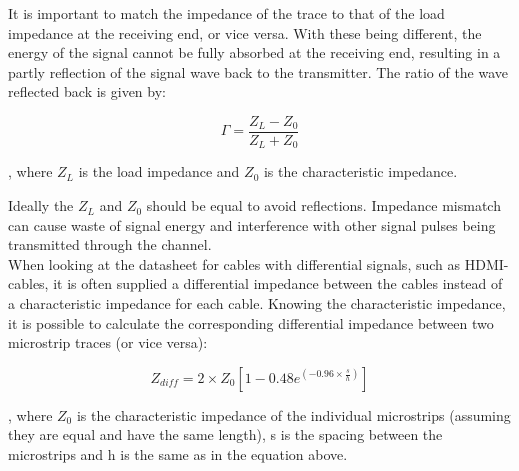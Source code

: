 \documentclass[main.tex]{subfiles}
\begin{document}
It is important to match the impedance of the trace to that of the load impedance at the receiving end, or vice versa. With these being different, the energy of the signal cannot be fully absorbed at the receiving end, resulting in a partly reflection of the signal wave back to the transmitter. The ratio of the wave reflected back is given by:

\begin{equation}
\Gamma = \frac{Z_L - Z_0}{Z_L + Z_0}	
\end{equation}

, where $Z_L$ is the load impedance and $Z_0$ is the characteristic impedance.

Ideally the $Z_L$ and $Z_0$ should be equal to avoid reflections. Impedance mismatch can cause waste of signal energy and interference with other signal pulses being transmitted through the channel. \cite{weste11} \\

When looking at the datasheet for cables with differential signals, such as HDMI-cables, it is often supplied a differential impedance between the cables instead of a characteristic impedance for each cable. Knowing the characteristic impedance, it is possible to calculate the corresponding differential impedance between two microstrip traces (or vice versa):

\begin{equation}
    Z_{diff} = 2 \times Z_0 [1 - 0.48 e^{(-0.96 \times \frac{s}{h})}]
\end{equation}

, where $Z_0$ is the characteristic impedance of the individual microstrips (assuming they are equal and have the same length), s is the spacing between the microstrips and h is the same as in the equation above.
\cite{douglas98}
\end{document}
